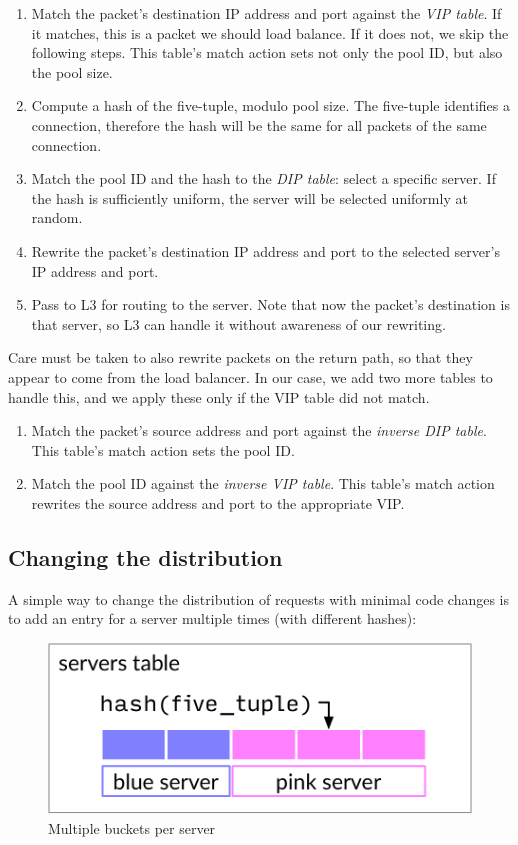 \documentclass[11pt,oneside,a4paper]{article}
\begin{document}
\begin{enumerate}
\item Match the packet's destination IP address and port against the \emph{VIP
    table}.
    If it matches, this is a packet we should load balance.
    If it does not, we skip the following steps.
    This table's match action sets not only the pool ID, but also the pool size.
\item Compute a hash of the five-tuple, modulo pool size.
    The five-tuple identifies a connection, therefore the hash will be the same
    for all packets of the same connection.
\item Match the pool ID and the hash to the \emph{DIP table}: select a specific
    server.
    If the hash is sufficiently uniform, the server will be selected uniformly
    at random.
\item Rewrite the packet's destination IP address and port to the selected
    server's IP address and port.
\item Pass to L3 for routing to the server.
   Note that now the packet's destination is that server, so L3 can handle it
   without awareness of our rewriting.
\end{enumerate}

Care must be taken to also rewrite packets on the return path, so that they
appear to come from the load balancer.
In our case, we add two more tables to handle this, and we apply these only if
the VIP table did not match.

\begin{enumerate}
\item Match the packet's source address and port against the \emph{inverse DIP
    table}.
    This table's match action sets the pool ID.
\item Match the pool ID against the \emph{inverse VIP table}.
    This table's match action rewrites the source address and port to the
    appropriate VIP.
\end{enumerate}

\subsection{Changing the distribution}
A simple way to change the distribution of requests with minimal code changes is
to add an entry for a server multiple times (with different hashes):

\begin{figure}[h]
\centering
\includegraphics[width=.35\textwidth]{figures/buckets.pdf}
\caption{Multiple buckets per server}
\label{fig:buckets}
\end{figure}
\end{document}
